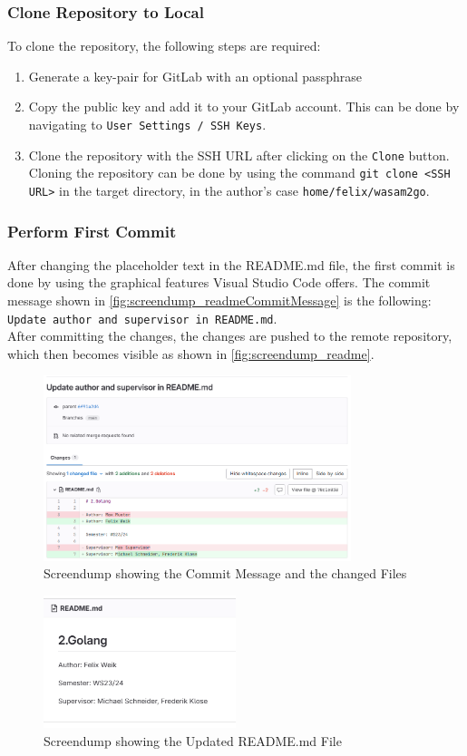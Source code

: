 \subsubsection*{Clone Repository to Local}
To clone the repository, the following steps are required:
\begin{enumerate}
    \item Generate a key-pair for GitLab with an optional passphrase
    \item Copy the public key and add it to your GitLab account.
    This can be done by navigating to \texttt{User Settings / SSH Keys}.
    \item Clone the repository with the SSH URL after clicking on the \texttt{Clone} button.
    Cloning the repository can be done by using the command \texttt{git clone <SSH URL>} in the target directory, in the author's case \texttt{home/felix/wasam2go}.
\end{enumerate}

\subsubsection*{Perform First Commit}
After changing the placeholder text in the README.md file, the first commit is done by using the graphical features Visual Studio Code offers.
The commit message shown in \autoref{fig:screendump_readmeCommitMessage} is the following: \texttt{Update author and supervisor in README.md}. \\
After committing the changes, the changes are pushed to the remote repository, which then becomes visible as shown in \autoref{fig:screendump_readme}.

\begin{figure}
    \centering
    \includegraphics[width=0.8\textwidth]{figures/goLang/golang_screendumpReadmeCommit.png}
    \caption{Screendump showing the Commit Message and the changed Files}
    \label{fig:screendump_readmeCommitMessage}
\end{figure}

\begin{figure}
    \centering
    \includegraphics[width=0.5\textwidth]{figures/goLang/golang_screendumpReadme.png}
    \caption{Screendump showing the Updated README.md File}
    \label{fig:screendump_readme}
\end{figure}
